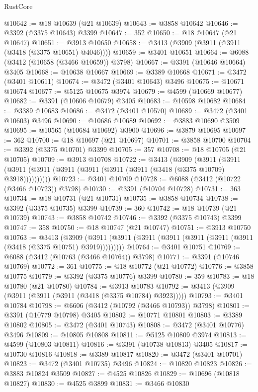 \begin{lexlean}{RustCore}
\begin{coremodule}
@10642 := @18 @10639 (@21 @10639)
@10643 := @3858 @10642
@10646 := @3392 (@3375 @10643) @3399
@10647 := 352
@10650 := @18 @10647 (@21 @10647)
@10651 := @3913 @10650
@10658 := @3413 (@3909 (@3911 (@3911 (@3418 (@3375 @10651) @4046))))
@10659 := @3401 @10651
@10664 := @6088 (@3412 (@10658 (@3466 @10659)) @3798)
@10667 := @3391 (@10646 @10664) @3405
@10668 := @10638 @10667
@10669 := @3389 @10668
@10671 := @3472 (@3401 @10611)
@10674 := @3472 (@3401 @10643) @3496
@10675 := @10671 @10674
@10677 := @5125 @10675 @3974
@10679 := @4599 (@10669 @10677)
@10682 := @3391 (@10606 @10679) @3405
@10683 := @10598 @10682
@10684 := @3389 @10683
@10686 := @3472 (@3401 @10570)
@10689 := @3472 (@3401 @10603) @3496
@10690 := @10686 @10689
@10692 := @3883 @10690 @3509
@10695 := @10565 (@10684 @10692) @3900
@10696 := @3879 @10695
@10697 := 362
@10700 := @18 @10697 (@21 @10697)
@10701 := @3858 @10700
@10704 := @3392 (@3375 @10701) @3399
@10705 := 357
@10708 := @18 @10705 (@21 @10705)
@10709 := @3913 @10708
@10722 := @3413
    (@3909
      (@3911 (@3911 (@3911 (@3911 (@3911 (@3911 (@3911 (@3911 (@3418 (@3375 @10709) @3918))))))))))
@10723 := @3401 @10709
@10728 := @6088 (@3412 (@10722 (@3466 @10723)) @3798)
@10730 := @3391 (@10704 @10728)
@10731 := 363
@10734 := @18 @10731 (@21 @10731)
@10735 := @3858 @10734
@10738 := @3392 (@3375 @10735) @3399
@10739 := 360
@10742 := @18 @10739 (@21 @10739)
@10743 := @3858 @10742
@10746 := @3392 (@3375 @10743) @3399
@10747 := 358
@10750 := @18 @10747 (@21 @10747)
@10751 := @3913 @10750
@10763 := @3413
    (@3909 (@3911 (@3911 (@3911 (@3911 (@3911 (@3911 (@3911 (@3418 (@3375 @10751) @3919)))))))))
@10764 := @3401 @10751
@10769 := @6088 (@3412 (@10763 (@3466 @10764)) @3798)
@10771 := @3391 (@10746 @10769)
@10772 := 361
@10775 := @18 @10772 (@21 @10772)
@10776 := @3858 @10775
@10779 := @3392 (@3375 @10776) @3399
@10780 := 359
@10783 := @18 @10780 (@21 @10780)
@10784 := @3913 @10783
@10792 := @3413 (@3909 (@3911 (@3911 (@3911 (@3418 (@3375 @10784) @3923)))))
@10793 := @3401 @10784
@10798 := @6606 (@3412 (@10792 (@3466 @10793)) @3798)
@10801 := @3391 (@10779 @10798) @3405
@10802 := @10771 @10801
@10803 := @3389 @10802
@10805 := @3472 (@3401 @10743)
@10808 := @3472 (@3401 @10776) @3496
@10809 := @10805 @10808
@10811 := @5125 @10809 @3974
@10813 := @4599 (@10803 @10811)
@10816 := @3391 (@10738 @10813) @3405
@10817 := @10730 @10816
@10818 := @3389 @10817
@10820 := @3472 (@3401 @10701)
@10823 := @3472 (@3401 @10735) @3496
@10824 := @10820 @10823
@10826 := @3883 @10824 @3509
@10827 := @4525 @10826
@10829 := @10696 (@10818 @10827)
@10830 := @4525 @3899
@10831 := @3466 @10830

\end{coremodule}
\end{lexlean}
